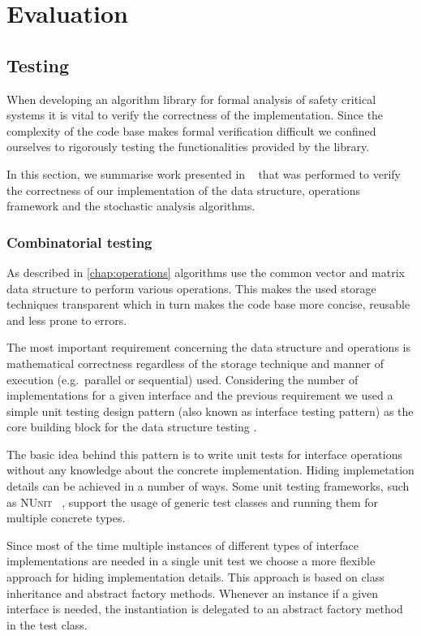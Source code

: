 \chapter{Evaluation}
\label{chap:evaluation}

\section{Testing}

When developing an algorithm library for formal analysis of safety
critical systems it is vital to verify the correctness of the
implementation. Since the complexity of the code base makes formal
verification difficult we confined ourselves to rigorously testing the
functionalities provided by the library.

In this section, we summarise work presented in%
~\citep{TDK2015_Klenik_Marussy} that was performed to verify the
correctness of our implementation of the data structure, operations
framework and the stochastic analysis algorithms.

\subsection{Combinatorial testing}

As described in \cref{chap:operations} algorithms use the common
vector and matrix data structure to perform various operations. This
makes the used storage techniques transparent which in turn makes the
code base more concise, reusable and less prone to errors.

The most important requirement concerning the data structure and
operations is mathematical correctness regardless of the storage
technique and manner of execution (e.g.~parallel or sequential)
used. Considering the number of implementations for a given interface
and the previous requirement we used a simple unit testing design
pattern (also known as interface testing pattern) as the core building
block for the data structure testing \citep{myers2011art}.

The basic idea behind this pattern is to write unit tests for
interface operations without any knowledge about the concrete
implementation. Hiding implemetation details can be achieved in a
number of ways. Some unit testing frameworks, such as \textsc{NUnit}%
~\citep{NUnit}, support the usage of generic test classes and running
them for multiple concrete types.

Since most of the time multiple instances of different types of
interface implementations are needed in a single unit test we choose a
more flexible approach for hiding implementation details. This
approach is based on class inheritance and abstract factory
methods. Whenever an instance if a given interface is needed, the
instantiation is delegated to an abstract factory method in the test
class.

